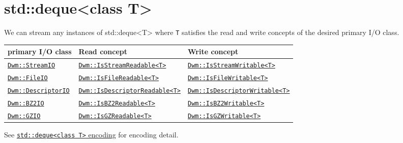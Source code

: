\begin{minipage}{\textwidth}
\section{\ttfamily std::deque<class T>}
We can stream any instances of {\ttfamily std::deque<T>} where
\texttt{T} satisfies the read and write concepts of the desired
primary I/O class.
\vspace{1ex}

\begin{tabular}{lll}
  \textbf{primary I/O class} & \textbf{Read concept} & \textbf{Write concept} \\ \hline
  \hyperref[section:DwmStreamIOClass]{\texttt{Dwm::StreamIO}} & \hyperref[concept:DwmIsStreamReadable]{\texttt{Dwm::IsStreamReadable<T>}} & \hyperref[concept:DwmIsStreamWritable]{\texttt{Dwm::IsStreamWritable<T>}} \\
  \hyperref[section:DwmFileIOClass]{\texttt{Dwm::FileIO}} & \hyperref[concept:DwmIsFileReadable]{\texttt{Dwm::IsFileReadable<T>}} & \hyperref[concept:DwmIsFileWritable]{\texttt{Dwm::IsFileWritable<T>}} \\
  \hyperref[section:DwmDescriptorIOClass]{\texttt{Dwm::DescriptorIO}} & \hyperref[concept:DwmIsDescriptorReadable]{\texttt{Dwm::IsDescriptorReadable<T>}} & \hyperref[concept:DwmIsDescriptorWritable]{\texttt{Dwm::IsDescriptorWritable<T>}} \\
  \hyperref[section:DwmBZ2IOClass]{\texttt{Dwm::BZ2IO}} & \hyperref[concept:DwmIsBZ2Readable]{\texttt{Dwm::IsBZ2Readable<T>}} & \hyperref[concept:DwmIsBZ2Writable]{\texttt{Dwm::IsBZ2Writable<T>}} \\
  \hyperref[section:DwmGZIOClass]{\texttt{Dwm::GZIO}} & \hyperref[concept:DwmIsGZReadable]{\texttt{Dwm::IsGZReadable<T>}} & \hyperref[concept:DwmIsGZWritable]{\texttt{Dwm::IsGZWritable<T>}} \\
\end{tabular}
\vspace{1ex}

See \hyperref[encoding:stdDeque]{\texttt{std::deque<class T>} encoding} for
encoding detail.
\end{minipage}

